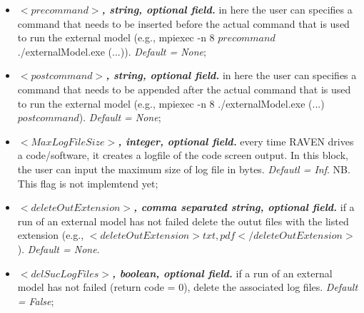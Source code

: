 \begin{itemize}
\item $<precommand>$\textbf{\textit{, string, optional field.}} in here the user can specifies a command that needs to be inserted before the actual command that is used to run the external model (e.g., mpiexec -n 8 $precommand$ ./externalModel.exe (...)). \textit{Default = None};  

\item $<postcommand>$\textbf{\textit{, string, optional field.}} in here the user can specifies a command that needs to be appended after the actual command that is used to run the external model (e.g., mpiexec -n 8  ./externalModel.exe (...) $postcommand$). \textit{Default = None};

\item $<MaxLogFileSize>$\textbf{\textit{, integer, optional field.}}  every time RAVEN drives a code/software, it creates a logfile of the code screen output. In this block, the user can input the maximum size of log file in bytes. \textit{Defautl = Inf}. NB. This flag is not implemtend yet; 

\item $<deleteOutExtension>$\textbf{\textit{, comma separated string, optional field.}} if a run of an external model has not failed delete the outut files with the listed extension (e.g., $<deleteOutExtension>txt,pdf</deleteOutExtension>$). \textit{Default = None}.

\item $<delSucLogFiles>$\textbf{\textit{, boolean, optional field.}} if a run of an external model has not failed (return code = 0), delete the associated log files. \textit{Default = False};

\end{itemize}

